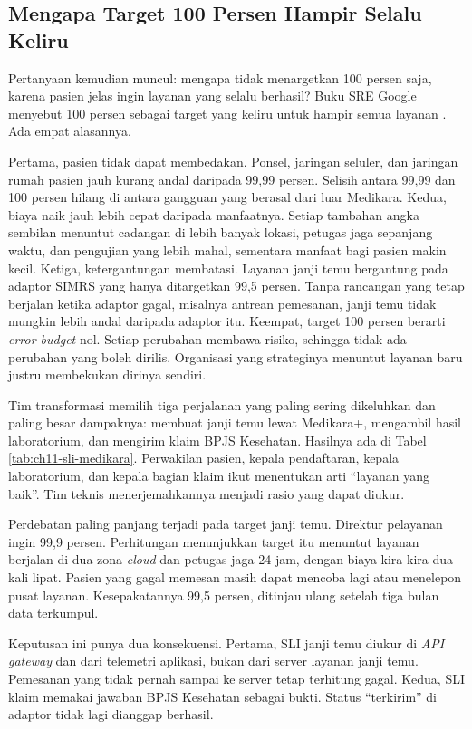 \subsection{Mengapa Target 100 Persen Hampir Selalu Keliru}

Pertanyaan kemudian muncul: mengapa tidak menargetkan 100 persen saja, karena pasien jelas ingin
layanan yang selalu berhasil? Buku SRE Google menyebut 100 persen sebagai target yang keliru untuk
hampir semua layanan \cite{beyer2016}. Ada empat alasannya.

Pertama, pasien tidak dapat membedakan. Ponsel, jaringan seluler, dan jaringan rumah pasien jauh
kurang andal daripada 99,99 persen. Selisih antara 99,99 dan 100 persen hilang di antara gangguan
yang berasal dari luar Medikara. Kedua, biaya naik jauh lebih cepat daripada manfaatnya. Setiap
tambahan angka sembilan menuntut cadangan di lebih banyak lokasi, petugas jaga sepanjang waktu,
dan pengujian yang lebih mahal, sementara manfaat bagi pasien makin kecil. Ketiga, ketergantungan
membatasi. Layanan janji temu bergantung pada adaptor SIMRS yang hanya ditargetkan 99,5 persen.
Tanpa rancangan yang tetap berjalan ketika adaptor gagal, misalnya antrean pemesanan, janji temu
tidak mungkin lebih andal daripada adaptor itu. Keempat, target 100 persen berarti \textit{error
budget} nol. Setiap perubahan membawa risiko, sehingga tidak ada perubahan yang boleh dirilis.
Organisasi yang strateginya menuntut layanan baru justru membekukan dirinya sendiri.

\begin{kasus}[title={Kasus Medikara Health: SLI untuk Tiga Perjalanan Pasien}]
  Tim transformasi memilih tiga perjalanan yang paling sering dikeluhkan dan paling besar
  dampaknya: membuat janji temu lewat Medikara+, mengambil hasil laboratorium, dan mengirim klaim
  BPJS Kesehatan. Hasilnya ada di Tabel \ref{tab:ch11-sli-medikara}. Perwakilan pasien, kepala
  pendaftaran, kepala laboratorium, dan kepala bagian klaim ikut menentukan arti ``layanan yang
  baik''. Tim teknis menerjemahkannya menjadi rasio yang dapat diukur.

  Perdebatan paling panjang terjadi pada target janji temu. Direktur pelayanan ingin 99,9 persen.
  Perhitungan menunjukkan target itu menuntut layanan berjalan di dua zona \textit{cloud} dan
  petugas jaga 24 jam, dengan biaya kira-kira dua kali lipat. Pasien yang gagal memesan masih dapat
  mencoba lagi atau menelepon pusat layanan. Kesepakatannya 99,5 persen, ditinjau ulang setelah
  tiga bulan data terkumpul.

  Keputusan ini punya dua konsekuensi. Pertama, SLI janji temu diukur di \textit{API gateway} dan
  dari telemetri aplikasi, bukan dari server layanan janji temu. Pemesanan yang tidak pernah sampai
  ke server tetap terhitung gagal. Kedua, SLI klaim memakai jawaban BPJS Kesehatan sebagai bukti.
  Status ``terkirim'' di adaptor tidak lagi dianggap berhasil.
\end{kasus}

